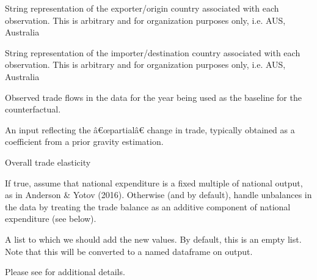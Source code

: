 \documentclass[a4paper]{book}
\begin{document}
\begin{Arguments}
\begin{ldescription}
\item[\code{exp\_id}] String representation of the exporter/origin country associated with each observation.
This is arbitrary and for organization purposes only, i.e. AUS, Australia

\item[\code{imp\_id}] String representation of the importer/destination country associated with each observation.
This is arbitrary and for organization purposes only, i.e. AUS, Australia

\item[\code{flows}] Observed trade flows in the data for the year being used as the baseline for the counterfactual.

\item[\code{beta}] An input reflecting the â€œpartialâ€ change in trade, typically obtained as a coefficient from a
prior gravity estimation.

\item[\code{theta}] Overall trade elasticity

\item[\code{mult}] If true, assume that national expenditure is a fixed multiple of national output,
as in Anderson \& Yotov (2016).
Otherwise (and by default), handle unbalances in the data by treating the
trade balance as an additive component of national expenditure (see below).

\item[\code{data}] A list to which we should add the new values. By default, this is an empty list.
Note that this will be converted to a named dataframe on output.
\end{ldescription}
\end{Arguments}
%
\begin{Details}\relax
Please see  for additional details.
\end{Details}
%
\end{document}
